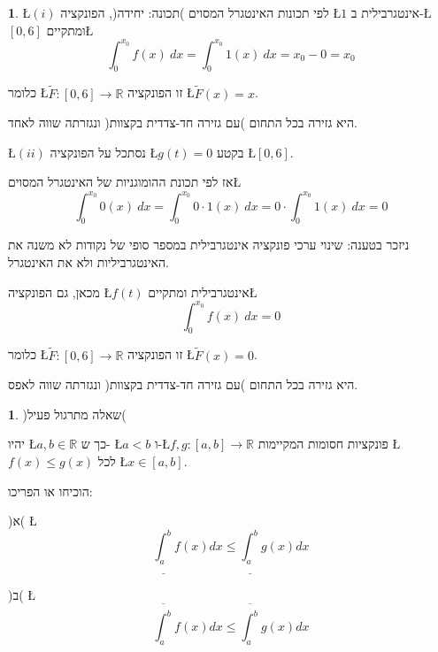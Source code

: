 \documentclass[english,hebrew]{article}
\theoremstyle{plain}
\theoremstyle{definition}
\newtheorem{xca}[thm]{\protect\exercisename}
\theoremstyle{definition}
\newtheorem*{sol*}{\protect\solutionname}
\providecommand{\exercisename}{תרגיל}
\providecommand{\solutionname}{פתרון}
\begin{document}
\begin{sol*}
\L{$\left(i\right)$} לפי תכונות האינטגרל המסוים )תכונה: יחידה(, הפונקציה
\L{$1$} אינטגרבילית ב-\L{$\left[0,6\right]$} ומתקיים\L{%
\[
\int_{0}^{x_{0}}f(x)\ dx=\int_{0}^{x_{0}}1(x)\ dx=x_{0}-0=x_{0}
\]
}%

כלומר \L{$\tilde{F}:\left[0,6\right]\rightarrow\mathbb{R}$} זו הפונקציה
\L{$\tilde{F}\left(x\right)=x$}.

היא גזירה בכל התחום )עם גזירה חד-צדדית בקצוות( ונגזרתה שווה לאחד.

\L{$\left(ii\right)$} נסתכל על הפונקציה \L{$g(t)=0$} בקטע \L{$\left[0,6\right]$}.

אז לפי תכונת ההומוגניות של האינטגרל המסוים\L{%
\[
\int_{0}^{x_{0}}0(x)\ dx=\int_{0}^{x_{0}}0\cdot1(x)\ dx=0\cdot\int_{0}^{x_{0}}1(x)\ dx=0
\]
}%

ניזכר בטענה: שינוי ערכי פונקציה אינטגרבילית במספר סופי של נקודות לא
משנה את האינטגרביליות ולא את האינטגרל.

מכאן, גם הפונקציה \L{$f(t)$} אינטגרבילית ומתקיים\L{%
\[
\int_{0}^{x_{0}}f(x)\ dx=0
\]
}%

כלומר \L{$\tilde{F}:\left[0,6\right]\rightarrow\mathbb{R}$} זו הפונקציה
\L{$\tilde{F}\left(x\right)=0$}.

היא גזירה בכל התחום )עם גזירה חד-צדדית בקצוות( ונגזרתה שווה לאפס.
\end{sol*}
\begin{xca}
)שאלה מתרגול פעיל(

יהיו \L{$a,b\in\mathbb{R}$} כך ש- \L{$a<b$} ו-\L{$f,g:[a,b]\to\mathbb{R}$}
פונקציות חסומות המקיימות \L{$f(x)\le g(x)$} לכל \L{$x\in[a,b]$}.

הוכיחו או הפריכו:

)א( \L{%
\[
\underline{\int_{a}^{b}}f(x)dx\le\underline{\int_{a}^{b}}g(x)dx
\]
}%

)ב( \L{%
\[
\overline{\int_{a}^{b}}f(x)dx\le\overline{\int_{a}^{b}}g(x)dx
\]
}%
\end{xca}
\end{document}
